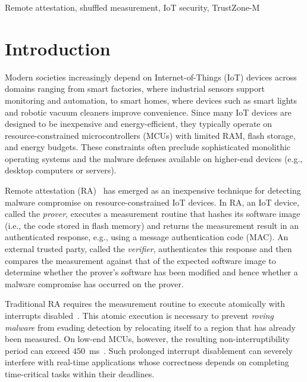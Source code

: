 \documentclass[conference]{IEEEtran}
\begin{document}
\begin{IEEEkeywords}
Remote attestation, shuffled measurement, IoT security, TrustZone-M
\end{IEEEkeywords}

\section{Introduction}
\label{sec:intro}

Modern societies increasingly depend on Internet-of-Things (IoT) devices across domains ranging from smart factories, where industrial sensors support monitoring and automation, to smart homes, where devices such as smart lights and robotic vacuum cleaners improve convenience. 
Since many IoT devices are designed to be inexpensive and energy-efficient, they typically operate on resource-constrained microcontrollers (MCUs) with limited RAM, flash storage, and energy budgets. These constraints often preclude sophisticated monolithic operating systems and the malware defenses available on higher-end devices (e.g., desktop computers or servers).

Remote attestation (RA)~\cite{eldefrawy2012smart,nunes2019vrased,eldefrawy2017hydra} has emerged as an inexpensive technique for detecting malware compromise on resource-constrained IoT devices. In RA, an IoT device, called the \emph{prover}, executes a measurement routine that hashes its software image (i.e., the code stored in flash memory) and returns the measurement result in an authenticated response, e.g., using a message authentication code (MAC). 
An external trusted party, called the \emph{verifier}, authenticates this response and then compares the measurement against that of the expected software image to determine whether the prover's software has been modified and hence whether a malware compromise has occurred on the prover.

Traditional RA requires the measurement routine to execute atomically with interrupts disabled~\cite{eldefrawy2012smart,nunes2019vrased,francillon2014minimalist}. This atomic execution is necessary to prevent \emph{roving malware} from evading detection by relocating itself to a region that has already been measured. On low-end MCUs, however, the resulting non-interruptibility period can exceed $450$~ms~\cite{nunes2019vrased}. Such prolonged interrupt disablement can severely interfere with real-time applications whose correctness depends on completing time-critical tasks within their deadlines.
\end{document}
